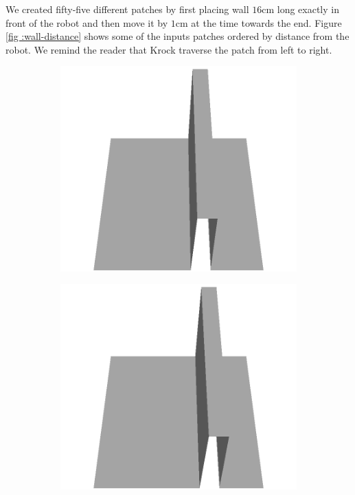 \documentclass[../document.tex]{subfiles}
\begin{document}
We created fifty-five different patches by first placing wall $16$cm long exactly in front of the robot and then move it by $1$cm at the time towards the end. Figure \ref{fig :wall-distance} shows some of the inputs patches ordered by distance from the robot. We remind the reader that Krock traverse the patch from left to right.
\begin{figure}[htbp]
    \centering
    \begin{subfigure}[b]{0.24\textwidth}
    \includegraphics[width=\linewidth]{../img/5/custom_patches/walls_front/all/00-3d.png}
    \end{subfigure}
    \begin{subfigure}[b]{0.24\textwidth}
    \includegraphics[width=\linewidth]{../img/5/custom_patches/walls_front/all/04-3d.png}

\end{subfigure}
\end{figure}
\end{document}
